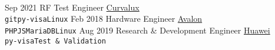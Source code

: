 \documentclass[9pt]{developercv} %
\begin{document}
\vspace{0.5cm}



\begin{minipage}[t]{0.4\textwidth} %
	\vspace{-\baselineskip} %
	
	\lorem \lorem \lorem \lorem \lorem\\ %
\end{minipage}
\hfill %
\begin{minipage}[t]{0.5\textwidth} %
	\vspace{-\baselineskip} %
	\begin{barchart}{5.5}
	\end{barchart}
\end{minipage}



\begin{entrylist}
	\entry
		{Sep 2021}
		{RF Test Engineer}
		{\href{https://Curvalux.com}{Curvalux}}
		{\lorem \lorem \lorem\\ \texttt{git}\slashsep\texttt{py-visa}\slashsep\texttt{Linux}}
	\entry
		{Feb 2018}
		{Hardware Engineer}
		{\href{https://avalonrov.wixsite.com/avalonrov}{Avalon}}
		{\lorem\lorem\\ \texttt{PHP}\slashsep\texttt{JS}\slashsep\texttt{MariaDB}\slashsep\texttt{Linux}}
	\entry
		{Aug 2019}
		{Research \& Development Engineer}
		{\href{https://www.huawei.com/uk/contact-us}{Huawei}}
		{\lorem\lorem\\ \texttt{py-visa}\slashsep\texttt{Test \& Validation}}
\end{entrylist}

\end{document}
